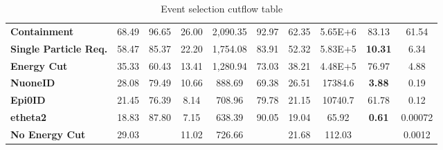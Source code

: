 \documentclass[12pt]{article}
\begin{document}
\begin{table}[!hb]
\begin{tabular}{|l|ccc|ccc|ccc|}
\textbf{Containment}                                     & 68.49                                  & 96.65     & 26.00     & 2,090.35                                         & 92.97     & 62.35     & 5.65E+6                                         & 83.13     & 61.54     \\
\textbf{Single Particle Req.}                            & 58.47                                  & 85.37     & 22.20     & 1,754.08                                         & 83.91     & 52.32     & 5.83E+5                                         & \textbf{10.31}     & 6.34      \\
\textbf{Energy Cut}                                      & 35.33                                  & 60.43     & 13.41     & 1,280.94                                         & 73.03     & 38.21     & 4.48E+5                                         & 76.97     & 4.88      \\
\textbf{NuoneID}                                         & 28.08                                  & 79.49     & 10.66     & 888.69                                          & 69.38     & 26.51     & 17384.6                                         & \textbf{3.88}      & 0.19      \\
\textbf{Epi0ID}                                          & 21.45                                  & 76.39     & 8.14      & 708.96                                          & 79.78     & 21.15     & 10740.7                                         & 61.78     & 0.12      \\
\rowcolor[HTML]{67FD9A} 
\textbf{etheta2}                                         & 18.83                                  & 87.80     & 7.15      & 638.39                                          & 90.05     & 19.04     & 65.92                                           & \textbf{0.61}      & 0.00072   \\\hline\hline
\textbf{No Energy Cut}                                   & 29.03                                  &           & 11.02     & 726.66                                          &           & 21.68     & 112.03                                          &           & 0.0012   \\\hline
\end{tabular}
\caption{Event selection cutflow table}
\label{tab:CutflowTableSignal}
\end{table}
\end{document}
